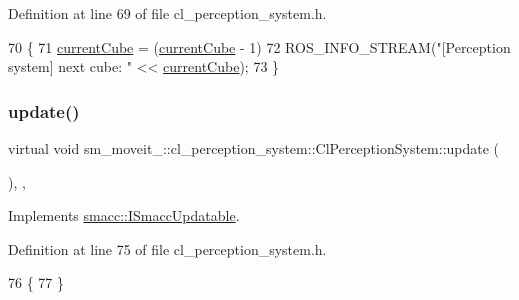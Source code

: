 Definition at line 69 of file cl\+\_\+perception\+\_\+system.\+h.


\begin{DoxyCode}
70             \{
71                 \hyperlink{classsm__moveit__4_1_1cl__perception__system_1_1ClPerceptionSystem_ae2a80b803814af8b3c87f810f2728af0}{currentCube} = (\hyperlink{classsm__moveit__4_1_1cl__perception__system_1_1ClPerceptionSystem_ae2a80b803814af8b3c87f810f2728af0}{currentCube} - 1) %
72                 ROS\_INFO\_STREAM(\textcolor{stringliteral}{"[Perception system] next cube: "} << \hyperlink{classsm__moveit__4_1_1cl__perception__system_1_1ClPerceptionSystem_ae2a80b803814af8b3c87f810f2728af0}{currentCube});
73             \}
\end{DoxyCode}
\mbox{\label{classsm__moveit__4_1_1cl__perception__system_1_1ClPerceptionSystem_a91de8cf71c93738f8bcbea388c84a5dd}} 
\subsubsection{\texorpdfstring{update()}{update()}}
{\footnotesize\ttfamily virtual void sm\+\_\+moveit\+\_\+::cl\+\_\+perception\+\_\+system\+::\+Cl\+Perception\+System\+::update (\begin{DoxyParamCaption}{ }\end{DoxyParamCaption})\hspace{0.3cm}{\ttfamily [inline]}, {\ttfamily [override]}, {\ttfamily [virtual]}}



Implements \hyperlink{classsmacc_1_1ISmaccUpdatable_a84ee0520cbefdb1d412bed54650b028e}{smacc\+::\+I\+Smacc\+Updatable}.



Definition at line 75 of file cl\+\_\+perception\+\_\+system.\+h.


\begin{DoxyCode}
76             \{
77             \}
\end{DoxyCode}


